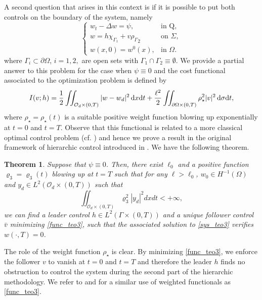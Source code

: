 \documentclass[preprint,10pt]{article}
\newtheorem{theorem}{Theorem}
\numberwithin{equation}{section}
\numberwithin{theorem}{section}
\def\dx{\,\textnormal{d}x}
\def\dt{\textnormal{d}t}
\def\d{\,\textnormal{d}}
\def\cbd{\Gamma}
\def\csbd{\rho_{\Gamma}}
\newcommand\csin[1]{\chi_{#1}}
\def\dx{\,\textnormal{d}x}
\def\dt{\textnormal{d}t}
\def\d{\,\textnormal{d}}
\begin{document}
{A second question that arises in this context is if it is possible to put both controls on the boundary of the system, namely
%
\begin{equation}\label{sys_teo3}
\begin{cases}
w_t-\Delta w=\psi, & \text{in Q}, \\
w= h\csin{\Gamma_1}+ v{\csbd}_{2} &\text{on } \Sigma, \\
w(x,0)=w^0(x), & \text{in } \Omega.
\end{cases}
\end{equation}
%
where $\Gamma_{i}\subset\partial \Omega$, $i=1,2,$ are open sets with $\cbd_1\cap\cbd_2\equiv \emptyset$. We provide a partial answer to this problem for the case when $\psi\equiv 0$ and the cost functional associated to the optimization problem is defined by
%
\begin{equation}\label{func_teo3}
I(v;h)=\frac{1}{2}\iint_{\mathcal O_d\times(0,T)}|w-w_d|^2\dx\dt+\frac{\ell^2}{2}\iint_{\partial\Omega\times(0,T)}\rho_\star^2|v|^2\d\sigma\dt,
\end{equation}
%
where $\rho_\star=\rho_\star(t)$ is a suitable positive weight function blowing up exponentially at $t=0$ and $t=T$. Observe that this functional is related to a more classical optimal control problem (cf. \cite{Lions_optim,trol}) and hence we prove a result in the original framework of hierarchic control introduced in \cite{LionsSta}. We have the following theorem.
%
\begin{theorem}\label{teo3}
Suppose that $\psi\equiv 0$. Then, there exist $\ell_0$ and a positive function $\varrho_3=\varrho_3(t)$ blowing up at $t=T$ such that for any $\ell>\ell_0$, $w_0\in H^{-1}(\Omega)$ and $y_d\in L^2(\mathcal O_d\times(0,T))$ such that
\begin{equation*}%
\iint_{\mathcal O_d\times(0,T)}\varrho_3^2|y_d|^2dxdt<+\infty,
\end{equation*}
we can find a leader control $h\in L^2(\cbd\times(0,T))$ and a unique follower control $\bar v$ minimizing \eqref{func_teo3}, such that the associated solution to \eqref{sys_teo3} verifies $w(\cdot,T)=0$.
\end{theorem}

The role of the weight function  $\rho_\star$ is clear. By minimizing \eqref{func_teo3}, we enforce the follower $v$ to vanish at $t=0$ and $t=T$ and therefore the leader $h$ finds no obstruction to control the system during the second part of the hierarchic methodology. We refer to \cite{araruna} and \cite{vhs_corri} for a similar use of weighted functionals as \eqref{func_teo3}. 

}
\end{document}
